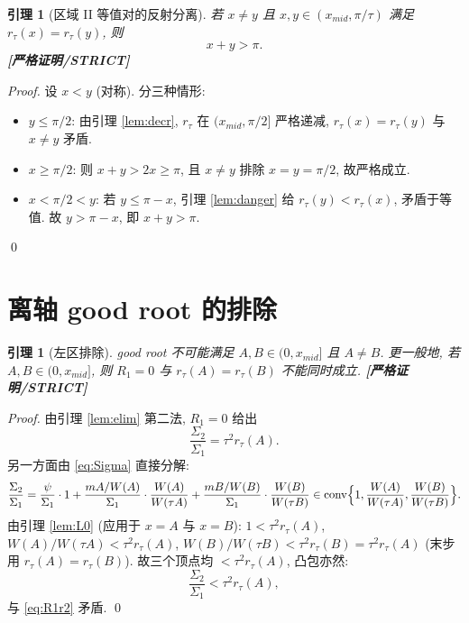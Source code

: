 \documentclass[UTF8]{ctexart}
\newtheorem{lemma}[theorem]{引理}
\newcommand{\STRICT}{\textbf{[严格证明/STRICT]}}
\begin{document}
\begin{lemma}[区域 II 等值对的反射分离]\label{lem:Bprime}
	若 $x\ne y$ 且 $x,y\in(x_{mid},\pi/\tau)$ 满足 $r_\tau(x)=r_\tau(y)$, 则
	\begin{equation}
		x+y>\pi.
		\label{eq:xypi}
	\end{equation}
	\STRICT{}
\end{lemma}

\begin{proof}
	设 $x<y$ (对称). 分三种情形:
	\begin{itemize}
		\item $y\le\pi/2$: 由引理 \ref{lem:decr}, $r_\tau$ 在 $(x_{mid},\pi/2]$
			严格递减, $r_\tau(x)=r_\tau(y)$ 与 $x\ne y$ 矛盾.
		\item $x\ge\pi/2$: 则 $x+y>2x\ge\pi$, 且 $x\ne y$ 排除 $x=y=\pi/2$,
			故严格成立.
		\item $x<\pi/2<y$: 若 $y\le\pi-x$, 引理 \ref{lem:danger} 给
			$r_\tau(y)<r_\tau(x)$, 矛盾于等值. 故 $y>\pi-x$, 即
			$x+y>\pi$.
	\end{itemize}
	\qed
\end{proof}

\section{离轴 good root 的排除}\label{sec:excl}

\begin{lemma}[左区排除]\label{lem:L3}
	good root 不可能满足 $A,B\in(0,x_{mid}]$ 且 $A\ne B$.
	更一般地, 若 $A,B\in(0,x_{mid}]$, 则 $R_1=0$ 与 $r_\tau(A)=r_\tau(B)$
	不能同时成立. \STRICT{}
\end{lemma}

\begin{proof}
	由引理 \ref{lem:elim} 第二法, $R_1=0$ 给出
	\begin{equation}
		\frac{\Sigma_2}{\Sigma_1}=\tau^2r_\tau(A).
		\label{eq:R1r2}
	\end{equation}
	另一方面由 \eqref{eq:Sigma} 直接分解:
	\begin{equation}
		\frac{\Sigma_2}{\Sigma_1}
		=\frac{\psi}{\Sigma_1}\cdot 1
		+\frac{mA/W(A)}{\Sigma_1}\cdot\frac{W(A)}{W(\tau A)}
		+\frac{mB/W(B)}{\Sigma_1}\cdot\frac{W(B)}{W(\tau B)}
		\in\operatorname{conv}\Bigl\{1,\frac{W(A)}{W(\tau A)},\frac{W(B)}{W(\tau B)}\Bigr\}.
		\label{eq:conv}
	\end{equation}
	由引理 \ref{lem:L0} (应用于 $x=A$ 与 $x=B$):
	$1<\tau^2r_\tau(A)$, $W(A)/W(\tau A)<\tau^2r_\tau(A)$,
	$W(B)/W(\tau B)<\tau^2r_\tau(B)=\tau^2r_\tau(A)$ (末步用 $r_\tau(A)=r_\tau(B)$).
	故三个顶点均 $<\tau^2r_\tau(A)$, 凸包亦然:
	\begin{equation}
		\frac{\Sigma_2}{\Sigma_1}<\tau^2r_\tau(A),
	\end{equation}
	与 \eqref{eq:R1r2} 矛盾. \qed
\end{proof}
\end{document}
